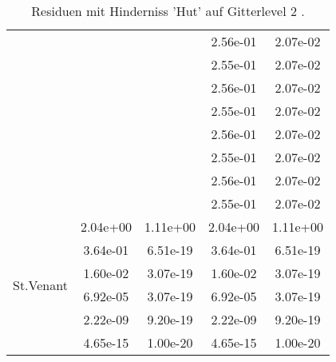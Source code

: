 \begin{table}
\begin{tabular}{c|cc|cc|}
\multicolumn{1}{|c|}{} & \multicolumn{1}{|c|}{} & \multicolumn{1}{|c|}{} & \multicolumn{1}{|c|}{  2.56e-01} & \multicolumn{1}{|c|}{  2.07e-02} \\ 
\multicolumn{1}{|c|}{} & \multicolumn{1}{|c|}{} & \multicolumn{1}{|c|}{} & \multicolumn{1}{|c|}{  2.55e-01} & \multicolumn{1}{|c|}{  2.07e-02} \\ 
\multicolumn{1}{|c|}{} & \multicolumn{1}{|c|}{} & \multicolumn{1}{|c|}{} & \multicolumn{1}{|c|}{  2.56e-01} & \multicolumn{1}{|c|}{  2.07e-02} \\ 
\multicolumn{1}{|c|}{} & \multicolumn{1}{|c|}{} & \multicolumn{1}{|c|}{} & \multicolumn{1}{|c|}{  2.55e-01} & \multicolumn{1}{|c|}{  2.07e-02} \\ 
\multicolumn{1}{|c|}{} & \multicolumn{1}{|c|}{} & \multicolumn{1}{|c|}{} & \multicolumn{1}{|c|}{  2.56e-01} & \multicolumn{1}{|c|}{  2.07e-02} \\ 
\multicolumn{1}{|c|}{} & \multicolumn{1}{|c|}{} & \multicolumn{1}{|c|}{} & \multicolumn{1}{|c|}{  2.55e-01} & \multicolumn{1}{|c|}{  2.07e-02} \\ 
\multicolumn{1}{|c|}{} & \multicolumn{1}{|c|}{} & \multicolumn{1}{|c|}{} & \multicolumn{1}{|c|}{  2.56e-01} & \multicolumn{1}{|c|}{  2.07e-02} \\ 
\multicolumn{1}{|c|}{} & \multicolumn{1}{|c|}{} & \multicolumn{1}{|c|}{} & \multicolumn{1}{|c|}{  2.55e-01} & \multicolumn{1}{|c|}{  2.07e-02} \\ 
\hline 
\multicolumn{1}{|c|}{\multirow{6}{*}{St.Venant}} &\multicolumn{1}{|c|}{  2.04e+00} & \multicolumn{1}{|c|}{  1.11e+00} & \multicolumn{1}{|c|}{  2.04e+00} & \multicolumn{1}{|c|}{  1.11e+00} \\ 
\multicolumn{1}{|c|}{} & \multicolumn{1}{|c|}{  3.64e-01} & \multicolumn{1}{|c|}{  6.51e-19} & \multicolumn{1}{|c|}{  3.64e-01} & \multicolumn{1}{|c|}{  6.51e-19} \\ 
\multicolumn{1}{|c|}{} & \multicolumn{1}{|c|}{  1.60e-02} & \multicolumn{1}{|c|}{  3.07e-19} & \multicolumn{1}{|c|}{  1.60e-02} & \multicolumn{1}{|c|}{  3.07e-19} \\ 
\multicolumn{1}{|c|}{} & \multicolumn{1}{|c|}{  6.92e-05} & \multicolumn{1}{|c|}{  3.07e-19} & \multicolumn{1}{|c|}{  6.92e-05} & \multicolumn{1}{|c|}{  3.07e-19} \\ 
\multicolumn{1}{|c|}{} & \multicolumn{1}{|c|}{  2.22e-09} & \multicolumn{1}{|c|}{  9.20e-19} & \multicolumn{1}{|c|}{  2.22e-09} & \multicolumn{1}{|c|}{  9.20e-19} \\ 
\multicolumn{1}{|c|}{} & \multicolumn{1}{|c|}{  4.65e-15} & \multicolumn{1}{|c|}{  1.00e-20} & \multicolumn{1}{|c|}{  4.65e-15} & \multicolumn{1}{|c|}{  1.00e-20} \\ 
\hline 
\end{tabular}\caption{Residuen mit Hinderniss 'Hut' auf Gitterlevel 2 .}\label{tab:Residuum_Hut_level2}
\end{table} 
